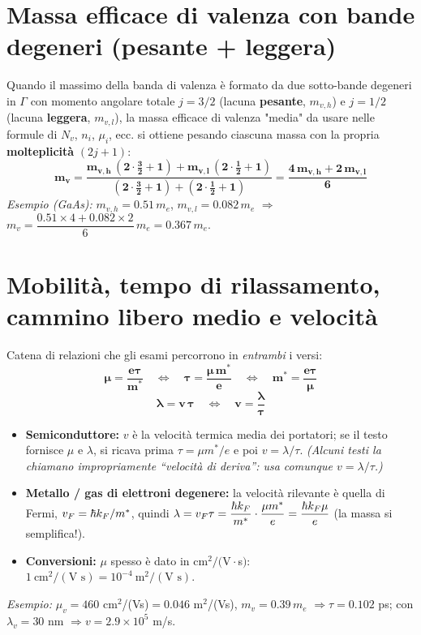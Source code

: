 \section{Massa efficace di valenza con bande degeneri (pesante + leggera)}
Quando il massimo della banda di valenza è formato da due sotto-bande degeneri in $\Gamma$
con momento angolare totale $j=3/2$ (lacuna \textbf{pesante}, $m_{v,h}$) e $j=1/2$
(lacuna \textbf{leggera}, $m_{v,l}$), la massa efficace di valenza "media" da usare
nelle formule di $N_v$, $n_i$, $\mu_i$, ecc. si ottiene pesando ciascuna massa con la
propria \textbf{molteplicità} $(2j+1)$:
\[ \bm{m_v = \frac{m_{v,h}\,(2\cdot\tfrac32+1) + m_{v,l}\,(2\cdot\tfrac12+1)}{(2\cdot\tfrac32+1)+(2\cdot\tfrac12+1)}
        = \frac{4\,m_{v,h} + 2\,m_{v,l}}{6}} \]
\textit{Esempio (GaAs):} $m_{v,h}=0.51\,m_e$, $m_{v,l}=0.082\,m_e$ $\Rightarrow$
$m_v = \dfrac{0.51\times4+0.082\times2}{6}\,m_e = 0.367\,m_e$.

\section{Mobilità, tempo di rilassamento, cammino libero medio e velocità}
Catena di relazioni che gli esami percorrono in \emph{entrambi} i versi:
\[ \bm{\mu = \frac{e\tau}{m^*}} \quad\Longleftrightarrow\quad
   \bm{\tau = \frac{\mu\,m^*}{e}} \quad\Longleftrightarrow\quad
   \bm{m^* = \frac{e\tau}{\mu}} \]
\[ \bm{\lambda = v\,\tau} \quad\Longleftrightarrow\quad \bm{v = \frac{\lambda}{\tau}} \]
\begin{itemize}
  \setlength{\itemsep}{1pt}
  \item \textbf{Semiconduttore:} $v$ è la velocità termica media dei portatori; se il testo
  fornisce $\mu$ e $\lambda$, si ricava prima $\tau=\mu m^*/e$ e poi $v=\lambda/\tau$.
  \textit{(Alcuni testi la chiamano impropriamente ``velocità di deriva'': usa comunque $v=\lambda/\tau$.)}
  \item \textbf{Metallo / gas di elettroni degenere:} la velocità rilevante è quella di Fermi,
$v_F=\hbar k_F/m^*$, quindi $\lambda = v_F\tau = \dfrac{\hbar k_F}{m^*}\cdot\dfrac{\mu m^*}{e}
= \dfrac{\hbar k_F \mu}{e}$ (la massa si semplifica!).
  \item \textbf{Conversioni:} $\mu$ spesso è dato in cm$^2/(\text{V}\cdot$s$)$:
  $1\ \text{cm}^2/(\text{V s}) = 10^{-4}\ \text{m}^2/(\text{V s})$.
\end{itemize}
\textit{Esempio:} $\mu_v=460$ cm$^2$/(Vs)$=0.046$ m$^2$/(Vs), $m_v=0.39\,m_e$
$\Rightarrow \tau=0.102$ ps; con $\lambda_v=30$ nm $\Rightarrow v=2.9\times10^5$ m/s.

